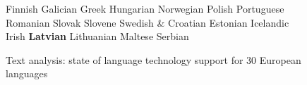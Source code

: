 \begin{figure}[t]
\begin{tabular}
Finnish \newline 
Galician \newline 
Greek \newline 
 Hungarian \newline 
Norwegian \newline 
Polish \newline 
Portuguese \newline 
Romanian \newline 
Slovak \newline 
Slovene \newline 
Swedish
& \vspace*{0.5mm}
Croatian \newline 
 Estonian \newline 
Icelandic \newline 
Irish \newline 
\textbf{Latvian} \newline 
Lithuanian \newline 
Maltese \newline 
 Serbian\\
\end{tabular}
\caption{Text analysis: state of language technology support for 30 European languages}
 \label{fig:speech_cluster_en}
\end{figure}
